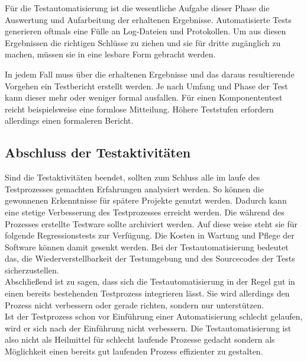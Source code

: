 Für die Testautomatisierung ist die wesentliche Aufgabe dieser Phase die Auswertung und Aufarbeitung der erhaltenen Ergebnisse. Automatisierte Tests generieren oftmals eine Fülle an Log-Dateien und Protokollen. Um aus diesen Ergebnissen die richtigen Schlüsse zu ziehen und sie für dritte zugänglich zu machen, müssen sie in eine lesbare Form gebracht werden.

In jedem Fall muss über die erhaltenen Ergebnisse und das daraus resultierende Vorgehen ein Testbericht erstellt werden. Je nach Umfang und Phase der Test kann dieser mehr oder weniger formal ausfallen. Für einen Komponententest reicht beispielsweise eine formlose Mitteilung. Höhere Teststufen erfordern allerdings einen formaleren Bericht.



\subsection{Abschluss der Testaktivitäten}
\label{subsec:abschluss_der_testaktivitäten}
Sind die Testaktivitäten beendet, sollten zum Schluss alle im laufe des Testprozesses gemachten Erfahrungen analysiert werden. So können die gewonnenen Erkenntnisse für spätere Projekte genutzt werden. Dadurch kann eine stetige Verbesserung des Testprozesses erreicht werden.
Die während des Prozesses erstellte Testware sollte archiviert werden. Auf diese weise steht sie für folgende Regressionstests zur Verfügung. Die Kosten in Wartung und Pflege der Software können damit gesenkt werden.
Bei der Testautomatisierung bedeutet das, die Wiederverstellbarkeit der Testumgebung und des Sourcecodes der Tests sicherzustellen.
\newline\\
Abschließend ist zu sagen, dass sich die Testautomatisierung in der Regel gut in einen bereits bestehenden Testprozess integrieren lässt. Sie wird allerdings \glqq den Prozess nicht verbessern oder gerade richten, sondern nur unterstützen.\grqq\ \cite[S.21]{seidl_basiswissen_2012} \\ Ist der Testprozess schon vor Einführung einer Automatisierung schlecht gelaufen, wird er sich nach der Einführung nicht verbessern.
Die Testautomatisierung ist also nicht als Heilmittel für schlecht laufende Prozesse gedacht sondern als Möglichkeit einen bereits gut laufenden Prozess effizienter zu gestalten.

